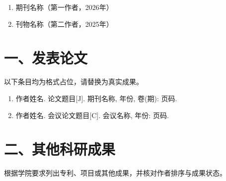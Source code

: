 \begingroup\songti{}\renewcommand{\baselinestretch}{1.5}\selectfont
\ifthesisreview
  \begin{enumerate}
    \item 期刊名称（第一作者，2026年）
    \item 刊物名称（第二作者，2025年）
  \end{enumerate}
\else
  \section*{一、发表论文}
  以下条目均为格式占位，请替换为真实成果。
  \begin{enumerate}
    \item 作者姓名. 论文题目[J]. 期刊名称, 年份, 卷(期): 页码.
    \item 作者姓名. 会议论文题目[C]. 会议名称, 年份: 页码.
  \end{enumerate}
  \section*{二、其他科研成果}
  根据学院要求列出专利、项目或其他成果，并核对作者排序与成果状态。
\fi
\endgroup
